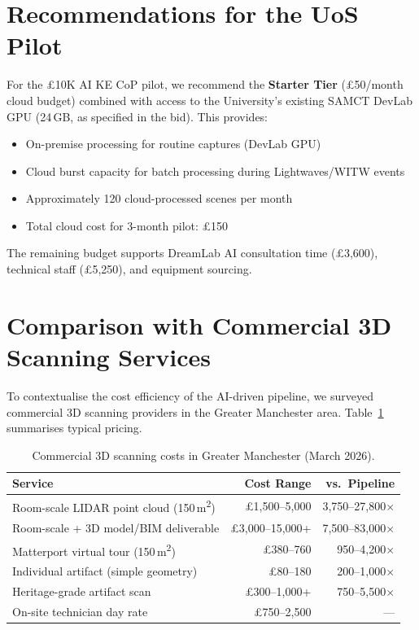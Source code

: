 \section{Recommendations for the UoS Pilot}

\begin{keyfinding}
For the \pounds10K AI KE CoP pilot, we recommend the \textbf{Starter Tier} (\pounds50/month cloud budget) combined with access to the University's existing SAMCT DevLab GPU (24\,GB, as specified in the bid). This provides:
\begin{itemize}
  \item On-premise processing for routine captures (DevLab GPU)
  \item Cloud burst capacity for batch processing during Lightwaves/WITW events
  \item Approximately 120 cloud-processed scenes per month
  \item Total cloud cost for 3-month pilot: \pounds150
\end{itemize}
The remaining budget supports DreamLab AI consultation time (\pounds3,600), technical staff (\pounds5,250), and equipment sourcing.
\end{keyfinding}

\section{Comparison with Commercial 3D Scanning Services}
\label{sec:commercial-comparison}

To contextualise the cost efficiency of the AI-driven pipeline, we surveyed commercial 3D scanning providers in the Greater Manchester area. Table~\ref{tab:commercial-scanning} summarises typical pricing.

\begin{table}[htbp]
\centering
\caption{Commercial 3D scanning costs in Greater Manchester (March 2026).}
\label{tab:commercial-scanning}
\small
\begin{tabular}{@{}p{5.5cm}rr@{}}
\toprule
\textbf{Service} & \textbf{Cost Range} & \textbf{vs.\ Pipeline} \\
\midrule
Room-scale LIDAR point cloud (150\,m\textsuperscript{2}) & \pounds1,500--5,000 & 3,750--27,800$\times$ \\
Room-scale + 3D model/BIM deliverable & \pounds3,000--15,000+ & 7,500--83,000$\times$ \\
Matterport virtual tour (150\,m\textsuperscript{2}) & \pounds380--760 & 950--4,200$\times$ \\
Individual artifact (simple geometry) & \pounds80--180 & 200--1,000$\times$ \\
Heritage-grade artifact scan & \pounds300--1,000+ & 750--5,500$\times$ \\
On-site technician day rate & \pounds750--2,500 & --- \\
\bottomrule
\end{tabular}
\end{table}

